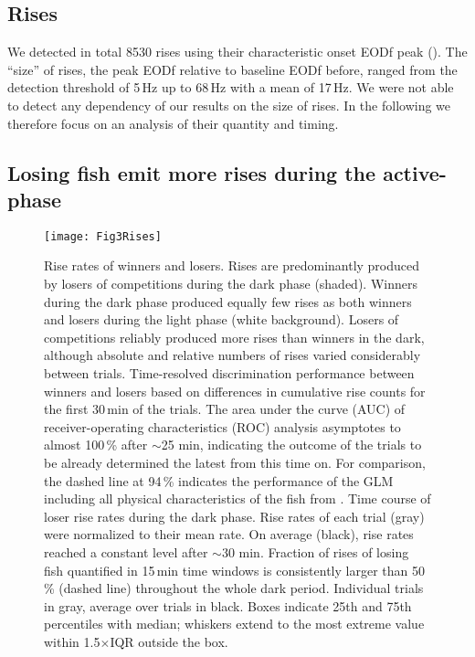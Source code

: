 \subsection{Rises}

We detected in total 8530 rises using their characteristic onset EODf peak (). The ``size'' of rises, the peak EODf relative to baseline EODf before, ranged from the detection threshold of 5\,Hz up to 68\,Hz with a mean of 17\,Hz. We were not able to detect any dependency of our results on the size of rises. In the following we therefore focus on an analysis of their quantity and timing.

\subsection{Losing fish emit more rises during the active-phase}

\begin{figure}[tp]
  \centerline{\texttt{[image: Fig3Rises]}}
  \caption{\label{EODfriserates} 
  Rise rates of winners and losers.  Rises are predominantly produced by losers of competitions during the dark phase (shaded). Winners during the dark phase produced equally few rises as both winners and losers during the light phase (white background).  Losers of competitions reliably produced more rises than winners in the dark, although absolute and relative numbers of rises varied considerably between trials.  Time-resolved discrimination performance between winners and losers based on differences in cumulative rise counts for the first 30\,min of the trials. The area under the curve (AUC) of receiver-operating characteristics (ROC) analysis asymptotes to almost 100\,\% after $\sim$25 min, indicating the outcome of the trials to be already determined the latest from this time on. For comparison, the dashed line at 94\,\% indicates the performance of the GLM including all physical characteristics of the fish from .  Time course of loser rise rates during the dark phase. Rise rates of each trial (gray) were normalized to their mean rate. On average (black), rise rates reached a constant level after $\sim$30 min.  Fraction of rises of losing fish quantified in 15\,min time windows is consistently larger than 50\,\% (dashed line) throughout the whole dark period. Individual trials in gray, average over trials in black. Boxes indicate 25th and 75th percentiles with median; whiskers extend to the most extreme value within 1.5$\times$IQR outside the box.}
\end{figure}

